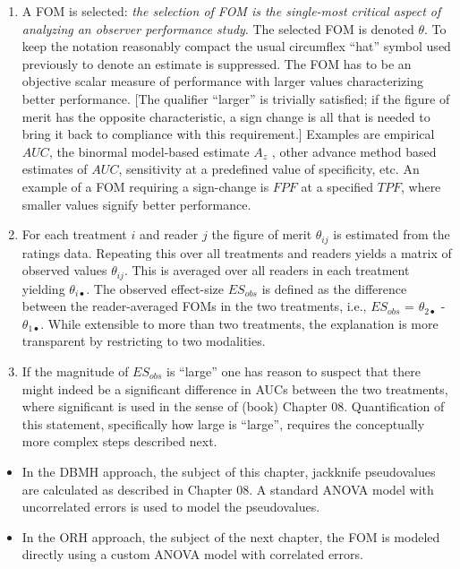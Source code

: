 \documentclass[
]{book}
\providecommand{\tightlist}{%
  \setlength{\itemsep}{0pt}\setlength{\parskip}{0pt}}
\begin{document}
\begin{enumerate}
\def\labelenumi{\arabic{enumi}.}
\tightlist
\item
  A FOM is selected: \emph{the selection of FOM is the single-most critical aspect of analyzing an observer performance study}. The selected FOM is denoted \(\theta\). To keep the notation reasonably compact the usual circumflex ``hat'' symbol used previously to denote an estimate is suppressed. The FOM has to be an objective scalar measure of performance with larger values characterizing better performance. {[}The qualifier ``larger'' is trivially satisfied; if the figure of merit has the opposite characteristic, a sign change is all that is needed to bring it back to compliance with this requirement.{]} Examples are empirical \(AUC\), the binormal model-based estimate \(A_z\) , other advance method based estimates of \(AUC\), sensitivity at a predefined value of specificity, etc. An example of a FOM requiring a sign-change is \(FPF\) at a specified \(TPF\), where smaller values signify better performance.
\item
  For each treatment \(i\) and reader \(j\) the figure of merit \(\theta_{ij}\) is estimated from the ratings data. Repeating this over all treatments and readers yields a matrix of observed values \(\theta_{ij}\). This is averaged over all readers in each treatment yielding \(\theta_{i\bullet}\). The observed effect-size \(ES_{obs}\) is defined as the difference between the reader-averaged FOMs in the two treatments, i.e., \(ES_{obs}\) = \(\theta_{2\bullet}\) - \(\theta_{1\bullet}\). While extensible to more than two treatments, the explanation is more transparent by restricting to two modalities.
\item
  If the magnitude of \(ES_{obs}\) is ``large'' one has reason to suspect that there might indeed be a significant difference in AUCs between the two treatments, where significant is used in the sense of (book) Chapter 08. Quantification of this statement, specifically how large is ``large'', requires the conceptually more complex steps described next.
\end{enumerate}

\begin{itemize}
\tightlist
\item
  In the DBMH approach, the subject of this chapter, jackknife pseudovalues are calculated as described in Chapter 08. A standard ANOVA model with uncorrelated errors is used to model the pseudovalues.
\item
  In the ORH approach, the subject of the next chapter, the FOM is modeled directly using a custom ANOVA model with correlated errors.
\end{itemize}
\end{document}
